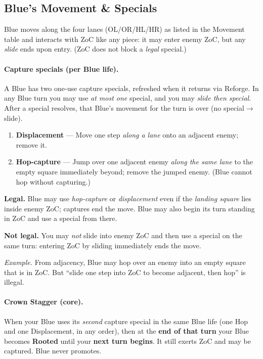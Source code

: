 \documentclass[11pt]{article}
\begin{document}
\subsection{Blue's Movement \& Specials}\label{sec:blue}
Blue moves along the four lanes (OL/OR/HL/HR) as listed in the Movement table and interacts with ZoC like any piece: it may enter enemy ZoC, but any \emph{slide} ends upon entry. (ZoC does not block a \emph{legal} special.)

\paragraph{Capture specials (per Blue life).}
A Blue has two one-use capture specials, refreshed when it returns via Reforge. In any Blue turn you may use \emph{at most one} special, and you may \emph{slide then special}. After a special resolves, that Blue's movement for the turn is over (no special$\rightarrow$slide).
\begin{enumerate}[label=(\alph*)]
  \item \textbf{Displacement} --- Move one step \emph{along a lane} onto an adjacent enemy; remove it.
  \item \textbf{Hop-capture} --- Jump over one adjacent enemy \emph{along the same lane} to the empty square immediately beyond; remove the jumped enemy. (Blue cannot hop without capturing.)
\end{enumerate}

\begin{tcolorbox}[enhanced,breakable,title={Rules Note --- ZoC and Blue Specials}]
\small
\textbf{Legal.} Blue may use \emph{hop-capture} or \emph{displacement} even if the \emph{landing square} lies inside enemy ZoC; captures end the move. Blue may also begin its turn standing in ZoC and use a special from there.

\textbf{Not legal.} You may \emph{not} slide into enemy ZoC and then use a special on the same turn: entering ZoC by sliding immediately ends the move.

\textit{Example.} From adjacency, Blue may hop over an enemy into an empty square that is in ZoC. But ``slide one step into ZoC to become adjacent, then hop'' is illegal.
\end{tcolorbox}

\paragraph{Crown Stagger (core).}
When your Blue uses its \emph{second} capture special in the same Blue life (one Hop and one Displacement, in any order), then at the \textbf{end of that turn} your Blue becomes \textbf{Rooted} until your \textbf{next turn begins}. It still exerts ZoC and may be captured. Blue never promotes.
\end{document}
